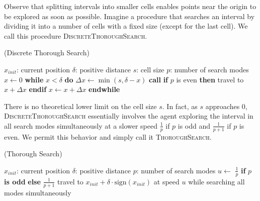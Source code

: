 Observe that splitting intervals into smaller cells enables points near the origin to be explored as soon as possible.
Imagine a procedure that searches an interval by dividing it into a number of cells with a fixed size (except for the last cell).
We call this procedure \textsc{DiscreteThoroughSearch}.

\begin{algorithm}[H]
  \caption{(Discrete Thorough Search)}
  \begin{algorithmic}[1]
      \Statex $x_{init}$: current position
      \Statex $\delta$: positive distance
      \Statex $s$: cell size
      \Statex $p$: number of search modes
      \State $x \gets 0$
      \State \textbf{while} $x < \delta$ \textbf{do} \Indent
      \State $\Delta x \gets \min(s, \delta - x)$
      \State \textbf{call} 
      \State \textbf{if} $p$ is even \textbf{then} travel to $x + \Delta x$ \textbf{endif}
      \State $x \gets x + \Delta x$\EndIndent
      \State \textbf{endwhile}
    \EndProcedure
  \end{algorithmic}
\end{algorithm}

There is no theoretical lower limit on the cell size $s$.
In fact, as $s$ approaches $0$, \textsc{DiscreteThoroughSearch} essentially involves the agent exploring the interval in all search modes simultaneously at a slower speed $\frac{1}{p}$ if $p$ is odd and $\frac{1}{p+1}$ if $p$ is even.
We permit this behavior and simply call it \textsc{ThoroughSearch}.

\begin{algorithm}[H]
\caption{(Thorough Search)}
    \begin{algorithmic}[1]
            \Statex $x_{init}$: current position
            \Statex $\delta$: positive distance
            \Statex $p$: number of search modes
            \State $u \gets$ $\frac{1}{p}$ \textbf{if} $p$ \textbf{is odd} \textbf{else} $\frac{1}{p+1}$
            \State travel to $x_{init} + \delta \cdot \text{sign}(x_{init})$ at speed $u$ while searching all modes simultaneously
        \EndProcedure
    \end{algorithmic}
\end{algorithm}

